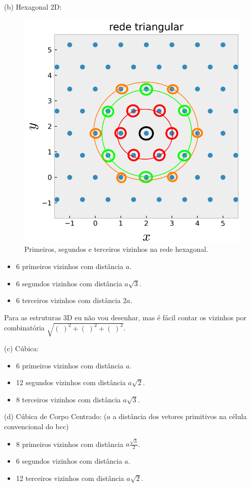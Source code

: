 \documentclass[a4paper,10pt]{article}
\begin{document}
(b) Hexagonal 2D:
\begin{figure}[H]
\centering
\includegraphics[width=0.3\linewidth]{fig/nn_triang}
\caption{Primeiros, segundos e terceiros vizinhos na rede hexagonal.}
\label{fig:nn_triang}
\end{figure}
\begin{itemize}
\item 6 primeiros vizinhos com distância $a$.
\item 6 segundos vizinhos com distância $a\sqrt{3}$.
\item 6 terceiros vizinhos com distância $2a$.
\end{itemize}

Para as estruturas 3D eu não vou desenhar, mas é fácil contar os vizinhos por combinatória $\sqrt{(\;)^2+(\;)^2+(\;)^2}$.

\n

(c) Cúbica:

\begin{itemize}
\item 6 primeiros vizinhos com distância $a$.
\item 12 segundos vizinhos com distância $a\sqrt{2}$.
\item 8 terceiros vizinhos com distância $a\sqrt{3}$.
\end{itemize}

(d) Cúbica de Corpo Centrado: ($a$ a distância dos vetores primitivos na célula convencional do bcc)

\begin{itemize}
\item 8 primeiros vizinhos com distância $a \frac{\sqrt{3}}{2}$.
\item 6 segundos vizinhos com distância $a$.
\item 12 terceiros vizinhos com distância $a\sqrt{2}$.
\end{itemize}

\section{}
\end{document}
